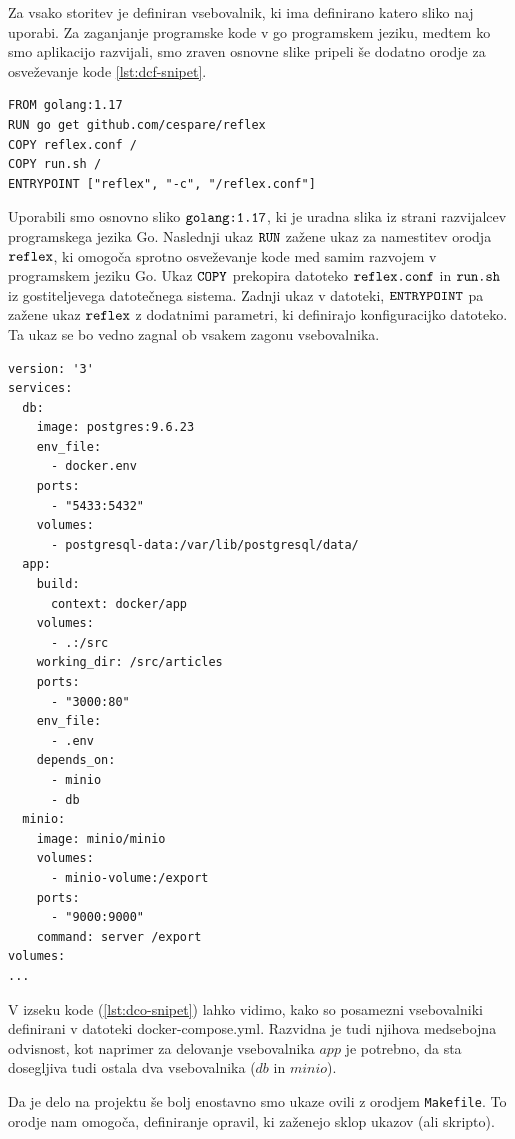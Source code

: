 \documentclass[a4paper, 12pt]{book}
\begin{document}
Za vsako storitev je definiran vsebovalnik, ki ima definirano katero sliko naj uporabi. Za zaganjanje programske kode v go programskem jeziku, medtem ko smo aplikacijo razvijali, smo zraven osnovne slike pripeli še dodatno orodje za osveževanje kode \ref{lst:dcf-snipet}.

\begin{lstlisting}[style=mystyle,caption={Dockerfile datoteka za razvijanje Go programske opreme},label=lst:dcf-snipet]
FROM golang:1.17
RUN go get github.com/cespare/reflex
COPY reflex.conf /
COPY run.sh /
ENTRYPOINT ["reflex", "-c", "/reflex.conf"]
\end{lstlisting}


Uporabili smo osnovno sliko $\verb=golang:1.17=$, ki je uradna slika iz strani razvijalcev programskega jezika Go. Naslednji ukaz $\verb=RUN=$ zažene ukaz za namestitev orodja $\verb=reflex=$, ki omogoča sprotno osveževanje kode med samim razvojem v programskem jeziku Go. Ukaz $\verb=COPY=$ prekopira datoteko $\verb=reflex.conf=$ in $\verb=run.sh=$ iz gostiteljevega datotečnega sistema. Zadnji ukaz v datoteki, $\verb=ENTRYPOINT=$ pa zažene ukaz $\verb=reflex=$ z dodatnimi parametri, ki definirajo konfiguracijko datoteko. Ta ukaz se bo vedno zagnal ob vsakem zagonu vsebovalnika.

\begin{lstlisting}[style=mystyle,caption={Izsek konfiguracijske datoteke docker-compose.yml},label=lst:dco-snipet]
version: '3'
services:
  db:
    image: postgres:9.6.23
    env_file:
      - docker.env
    ports:
      - "5433:5432"
    volumes:
      - postgresql-data:/var/lib/postgresql/data/
  app:
    build:
      context: docker/app
    volumes:
      - .:/src
    working_dir: /src/articles
    ports:
      - "3000:80"
    env_file:
      - .env
    depends_on:
      - minio
      - db
  minio:
    image: minio/minio
    volumes:
      - minio-volume:/export
    ports:
      - "9000:9000"
    command: server /export
volumes:
...
\end{lstlisting}
V izseku kode (\ref{lst:dco-snipet}) lahko vidimo, kako so posamezni vsebovalniki definirani v datoteki docker-compose.yml. Razvidna je tudi njihova medsebojna odvisnost, kot naprimer za delovanje vsebovalnika $app$ je potrebno, da sta dosegljiva tudi ostala dva vsebovalnika ($db$ in $minio$).

Da je delo na projektu še bolj enostavno smo ukaze ovili z orodjem \verb=Makefile=. To orodje nam omogoča, definiranje opravil, ki zaženejo sklop ukazov (ali skripto). 
\end{document}
